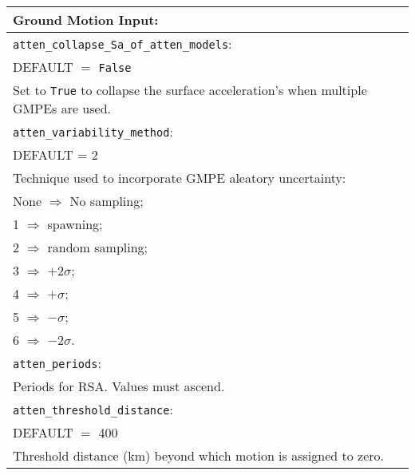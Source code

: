 \vspace{2em}
\begin{tabular}{|p{\textwidth}|}
\hline
\vspace{0.3em} \noindent \Large \textbf{Ground Motion Input:} \normalsize \\
\hline \vspace{0.1em}
\texttt{atten\_collapse\_Sa\_of\_atten\_models}: \\
DEFAULT $=$ \texttt{False} \\
Set to \texttt{True} to collapse the surface acceleration's when
multiple GMPEs are used.\\
\hline \vspace{0.1em} \texttt{atten\_variability\_method}: \\
DEFAULT  = 2 \\
 Technique used to
incorporate GMPE aleatory uncertainty: \\
 \hspace{0.5em} None $\Rightarrow$ No sampling; \\
 \hspace{0.5em} 1 $\Rightarrow$ spawning; \\
 \hspace{0.5em} 2 $\Rightarrow$ random sampling; \\
 \hspace{0.5em} 3 $\Rightarrow$ $+2\sigma$; \\
 \hspace{0.5em} 4 $\Rightarrow$ $+\sigma$; \\
 \hspace{0.5em} 5 $\Rightarrow$ $-\sigma$; \\
 \hspace{0.5em} 6 $\Rightarrow$ $-2\sigma$.\\
\hline \vspace{0.1em} \texttt{atten\_periods}: \\
Periods for RSA. Values must ascend. \\
\vspace{0.1em} \texttt{atten\_threshold\_distance}: \\
DEFAULT $=$ 400 \\
Threshold distance (km) beyond which motion is assigned to zero. \\

\end{tabular}
